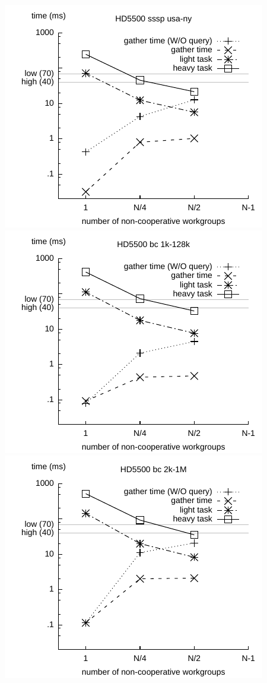 \documentclass[parskip=half,sigconf,review, anonymous=true, acmcopyrightmode=none]{acmart}
\begin{document}
\includegraphics[width=.7\columnwidth]{images/barrier/hd5500_sssp_usa_ny.pdf} \\
\includegraphics[width=.7\columnwidth]{images/barrier/hd5500_bc_1k_128k.pdf} \\
\includegraphics[width=.7\columnwidth]{images/barrier/hd5500_bc_2k_1M.pdf} \\
\end{document}
